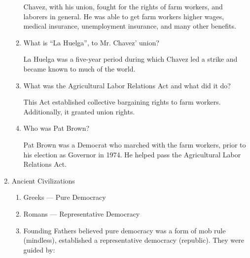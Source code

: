 \documentclass[12pt]{article}
\begin{document}
\begin{enumerate}
\begin{enumerate}
        \begin{justify}

          Chavez, with his union, fought for the rights of farm workers, and laborers in general. He was able to get farm workers higher wages, medical insurance, unemployment insurance, and many other benefits.

        \end{justify}

      \item What is “La Huelga”, to Mr. Chavez' union?

        \begin{justify}

          La Huelga was a five-year period during which Chavez led a strike and became known to much of the world.

        \end{justify}

      \item What was the Agricultural Labor Relations Act and what did it do?

        \begin{justify}

          This Act established collective bargaining rights to farm workers. Additionally, it granted union rights.

        \end{justify}

      \item Who was Pat Brown?

        \begin{justify}

          Pat Brown was a Democrat who marched with the farm workers, prior to his election as Governor in 1974. He helped pass the Agricultural Labor Relations Act.

        \end{justify}

    \end{enumerate}

  \item Ancient Civilizations

    \begin{enumerate}

      \item Greeks — Pure Democracy

      \item Romans — Representative Democracy

      \item Founding Fathers believed pure democracy was a form of mob rule (mindless), established a representative democracy (republic). They were guided by:


\end{enumerate}
\end{enumerate}
\end{document}
